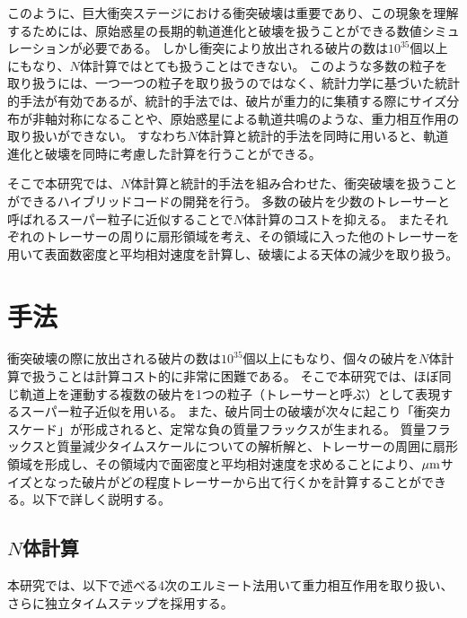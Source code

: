 \documentclass[a4paper,10pt,oneside,twocolumn,notitlepage,final]{jarticle}
\begin{document}
このように、巨大衝突ステージにおける衝突破壊は重要であり、この現象を理解するためには、原始惑星の長期的軌道進化と破壊を扱うことができる数値シミュレーションが必要である。
しかし衝突により放出される破片の数は$10^{35}$個以上にもなり、$N$体計算ではとても扱うことはできない。
このような多数の粒子を取り扱うには、一つ一つの粒子を取り扱うのではなく、統計力学に基づいた統計的手法が有効であるが、統計的手法では、破片が重力的に集積する際にサイズ分布が非軸対称になることや、原始惑星による軌道共鳴のような、重力相互作用の取り扱いができない。
すなわち$N$体計算と統計的手法を同時に用いると、軌道進化と破壊を同時に考慮した計算を行うことができる。

そこで本研究では、$N$体計算と統計的手法を組み合わせた、衝突破壊を扱うことができるハイブリッドコードの開発を行う。
多数の破片を少数のトレーサーと呼ばれるスーパー粒子に近似することで$N$体計算のコストを抑える。
またそれぞれのトレーサーの周りに扇形領域\citep{Morishima2015}を考え、その領域に入った他のトレーサーを用いて表面数密度と平均相対速度を計算し、破壊による天体の減少\citep{Kobayashi2010}を取り扱う。

\section{手法}
衝突破壊の際に放出される破片の数は$10^{35}$個以上にもなり、個々の破片を$N$体計算で扱うことは計算コスト的に非常に困難である。
そこで本研究では、ほぼ同じ軌道上を運動する複数の破片を1つの粒子（トレーサーと呼ぶ）として表現するスーパー粒子近似を用いる。
また、破片同士の破壊が次々に起こり「衝突カスケード」が形成されると、定常な負の質量フラックスが生まれる\citep[e.g.,][]{Tanaka1996}。
質量フラックスと質量減少タイムスケールについての解析解\citep{Kobayashi2010}と、トレーサーの周囲に扇形領域\citep{Morishima2015}を形成し、その領域内で面密度と平均相対速度を求めることにより、$\mu {\rm m}$サイズとなった破片がどの程度トレーサーから出て行くかを計算することができる。以下で詳しく説明する。
\subsection{$N$体計算}
本研究では、以下で述べる4次のエルミート法\citep{Makino1992}用いて重力相互作用を取り扱い、さらに独立タイムステップを採用する。
\end{document}

